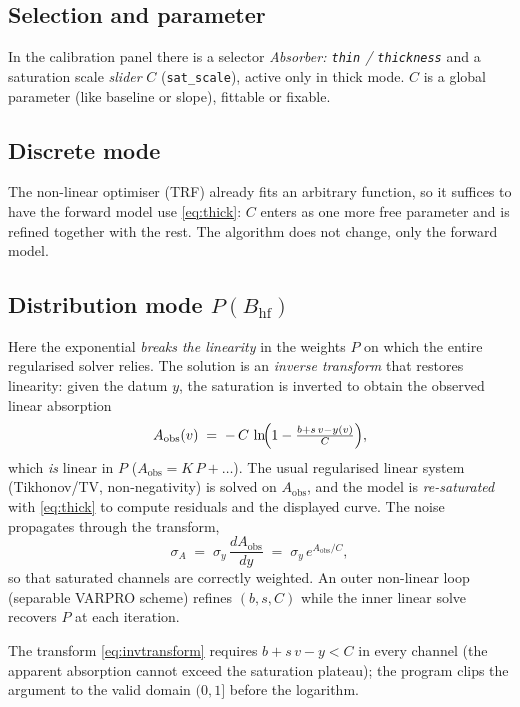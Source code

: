 \documentclass[11pt,a4paper]{article}
\newcommand{\BHF}{B_{\mathrm{hf}}}
\newcommand{\code}[1]{\texttt{\small #1}}
\begin{document}
\subsection{Selection and parameter}
In the calibration panel there is a selector \emph{Absorber: \code{thin} /
\code{thickness}} and a saturation scale \emph{slider} $C$
(\code{sat\_scale}), active only in thick mode. $C$ is a global parameter
(like baseline or slope), fittable or fixable.

\subsection{Discrete mode}
The non-linear optimiser (TRF) already fits an arbitrary function, so it suffices
to have the forward model use \eqref{eq:thick}: $C$ enters as one more free
parameter and is refined together with the rest. The algorithm does not change,
only the forward model.

\subsection{Distribution mode \texorpdfstring{$P(\BHF)$}{P(BHF)}}
Here the exponential \emph{breaks the linearity} in the weights $P$ on which
the entire regularised solver relies. The solution is an \emph{inverse transform}
that restores linearity: given the datum $y$, the saturation is inverted to
obtain the observed linear absorption
\begin{equation}
  A_{\text{obs}}(v) \;=\; -\,C\,\ln\!\Bigl(1 - \tfrac{b + s\,v - y(v)}{C}\Bigr),
  \label{eq:invtransform}
\end{equation}
which \emph{is} linear in $P$ ($A_{\text{obs}}=K\,P+\dots$). The usual
regularised linear system (Tikhonov/TV, non-negativity) is solved on
$A_{\text{obs}}$, and the model is \emph{re-saturated} with \eqref{eq:thick} to
compute residuals and the displayed curve. The noise propagates through the
transform,
\begin{equation}
  \sigma_{A} \;=\; \sigma_y\,\frac{dA_{\text{obs}}}{dy} \;=\; \sigma_y\,e^{A_{\text{obs}}/C},
\end{equation}
so that saturated channels are correctly weighted. An outer non-linear loop
(separable VARPRO scheme) refines $(b,s,C)$ while the inner linear solve
recovers $P$ at each iteration.

\begin{nota}
The transform \eqref{eq:invtransform} requires $b+s\,v-y < C$ in every channel
(the apparent absorption cannot exceed the saturation plateau); the program clips
the argument to the valid domain $(0,1]$ before the logarithm.
\end{nota}
\end{document}
